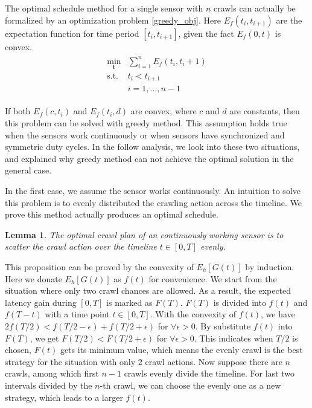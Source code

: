 \documentclass[conference]{IEEEtran}
\newtheorem{lemma}{Lemma}
\begin{document}
The optimal schedule method for a single sensor with $n$ crawls can actually be formalized by an optimization problem \ref{greedy_obj}. 
Here $E_f(t_i,t_{i+1})$ are the expectation function for time period $[t_i, t_{i+1}]$, given the fact $E_f(0,t)$ is convex.
\begin{eqnarray}
\begin{array}{ll}
\min_{\textbf{t}}& \sum_{i=1}^{n} E_f(t_i,t_i+1)\\
\text{s.t.}
& t_i < t_{i+1}\\
& i=1,\ldots,n-1
\end{array}\label{greedy_obj}
\end{eqnarray}

If both $E_f(c, t_i)$ and $E_f(t_i,d)$ are convex, where $c$ and $d$ are constants, then this problem can be solved with greedy method. 
This assumption holds true when the sensors work continuously or when sensors have synchronized and symmetric duty cycles.
In the follow analysis, we look into these two situations, and explained why greedy method can not achieve the optimal solution in the general case.

In the first case, we assume the sensor works continuously.
An intuition to solve this problem is to evenly distributed the crawling action across the timeline. 
We prove this method actually produces an optimal schedule.
\begin{lemma}
\label{evenly}
The optimal crawl plan of an continuously working sensor is to scatter the crawl action over the timeline $t\in [0, T]$ evenly.
\end{lemma}
\begin{IEEEproof}
This proposition can be proved by the convexity of $E_h[G(t)]$ \cite{boyd2004convex} by induction. 
Here we donate $E_h[G(t)]$ as $f(t)$ for convenience.
We start from the situation where only two crawl chances are allowed. 
As a result, the expected latency gain during $[0,T]$ is marked as $F(T)$.
$F(T)$ is divided into $f(t)$ and $f(T-t)$ with a time point $t\in[0,T]$. 
With the convexity of $f(t)$, we have $2f(T/2)<f(T/2-\epsilon)+f(T/2+\epsilon)$ for $\forall{\epsilon>0}$. 
By substitute $f(t)$ into $F(T)$, we get $F(T/2)<F(T/2+\epsilon)$ for $\forall{\epsilon>0}$.
This indicates when $T/2$ is chosen, $F(t)$ gets its minimum value, which means the evenly crawl is the best strategy for the situation with only $2$ crawl actions.
Now suppose there are $n$ crawls, among which first $n-1$ crawls evenly divide the timeline.
For last two intervals divided by the $n$-th crawl, we can choose the evenly one as a new strategy, which leads to a larger $f(t)$.
\end{IEEEproof}
\end{document}
